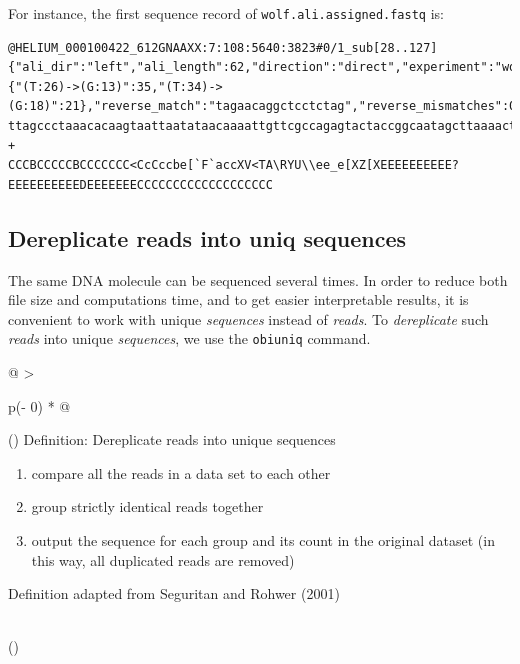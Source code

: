 \documentclass[
  letterpaper,
  DIV=11,
  numbers=noendperiod]{scrreprt}
\providecommand{\tightlist}{%
  \setlength{\itemsep}{0pt}\setlength{\parskip}{0pt}}\usepackage{longtable,booktabs,array}
\begin{document}
For instance, the first sequence record of
\texttt{wolf.ali.assigned.fastq} is:

\begin{verbatim}
@HELIUM_000100422_612GNAAXX:7:108:5640:3823#0/1_sub[28..127] {"ali_dir":"left","ali_length":62,"direction":"direct","experiment":"wolf_diet","forward_match":"ttagataccccactatgc","forward_mismatches":0,"forward_primer":"ttagataccccactatgc","forward_tag":"gcctcct","mode":"alignment","pairing_mismatches":{"(T:26)->(G:13)":35,"(T:34)->(G:18)":21},"reverse_match":"tagaacaggctcctctag","reverse_mismatches":0,"reverse_primer":"tagaacaggctcctctag","reverse_tag":"gcctcct","sample":"29a_F260619","score":484,"score_norm":0.968,"seq_a_single":46,"seq_ab_match":60,"seq_b_single":46}
ttagccctaaacacaagtaattaatataacaaaattgttcgccagagtactaccggcaatagcttaaaactcaaaggacttggcggtgctttataccctt
+
CCCBCCCCCBCCCCCCC<CcCccbe[`F`accXV<TA\RYU\\ee_e[XZ[XEEEEEEEEEE?EEEEEEEEEEDEEEEEEECCCCCCCCCCCCCCCCCCC
\end{verbatim}

\hypertarget{dereplicate-reads-into-uniq-sequences}{%
\subsection{Dereplicate reads into uniq
sequences}\label{dereplicate-reads-into-uniq-sequences}}

The same DNA molecule can be sequenced several times. In order to reduce
both file size and computations time, and to get easier interpretable
results, it is convenient to work with unique \emph{sequences} instead
of \emph{reads}. To \emph{dereplicate} such \emph{reads} into unique
\emph{sequences}, we use the \texttt{obiuniq} command.

\begin{longtable}[]{@{}
  >{\raggedright\arraybackslash}p{(\columnwidth - 0\tabcolsep) * }@{}}
\toprule()
\endhead
Definition: Dereplicate reads into unique sequences \\
\begin{minipage}[t]{\linewidth}\raggedright
\begin{enumerate}
\def\labelenumi{\arabic{enumi}.}
\tightlist
\item
  compare all the reads in a data set to each other
\item
  group strictly identical reads together
\item
  output the sequence for each group and its count in the original
  dataset (in this way, all duplicated reads are removed)
\end{enumerate}

Definition adapted from Seguritan and Rohwer (2001)
\end{minipage} \\
\bottomrule()
\end{longtable}
\end{document}
